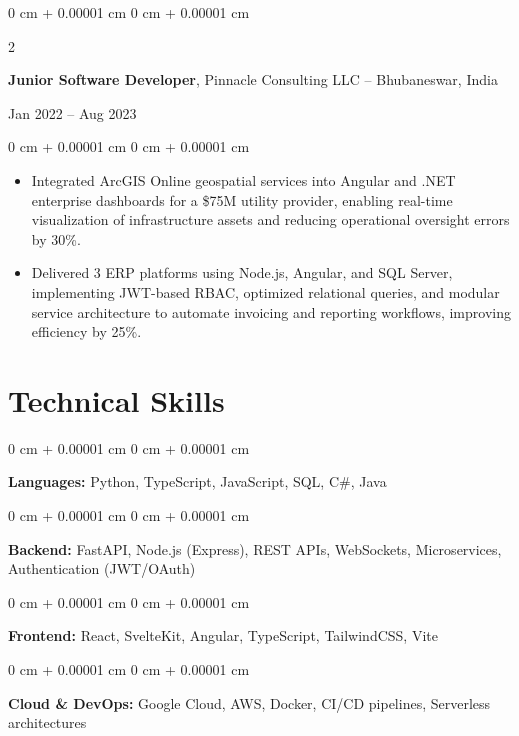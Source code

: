 \documentclass[10pt, letterpaper]{article}
\newenvironment{highlights}{
    \begin{itemize}[
        topsep=0.10 cm,
        parsep=0.10 cm,
        partopsep=0pt,
        itemsep=0pt,
        leftmargin=0 cm + 10pt
    ]
}{
    \end{itemize}
} %
\newenvironment{onecolentry}{
    \begin{adjustwidth}{
        0 cm + 0.00001 cm
    }{
        0 cm + 0.00001 cm
    }
}{
    \end{adjustwidth}
} %
\newenvironment{twocolentry}[2][]{
    \onecolentry
    \def\secondColumn{#2}
    \setcolumnwidth{\fill, 4.5 cm}
    \begin{paracol}{2}
}{
    \switchcolumn \raggedleft \secondColumn
    \end{paracol}
    \endonecolentry
} %
\renewenvironment{highlights}{
    \begin{itemize}[
        topsep=0.05cm,
        parsep=0.10cm,
        partopsep=1pt,
        itemsep=0pt,
        leftmargin=0cm + 10pt
    ]
}{
    \end{itemize}
}
\begin{document}
\begin{twocolentry}{Jan 2022 – Aug 2023}
\textbf{Junior Software Developer}, Pinnacle Consulting LLC -- Bhubaneswar, India
\end{twocolentry}
\vspace{0.05cm}
\begin{onecolentry}
\begin{highlights}
\item Integrated ArcGIS Online geospatial services into Angular and .NET enterprise dashboards for a \$75M utility provider, enabling real-time visualization of infrastructure assets and reducing operational oversight errors by 30\%.
\item Delivered 3 ERP platforms using Node.js, Angular, and SQL Server, implementing JWT-based RBAC, optimized relational queries, and modular service architecture to automate invoicing and reporting workflows, improving efficiency by 25\%.
\end{highlights}
\end{onecolentry}

\vspace{0.3cm}

\section{Technical Skills}

\begin{onecolentry}
\textbf{Languages:} Python, TypeScript, JavaScript, SQL, C\#, Java
\end{onecolentry}

\vspace{0.1cm}

\begin{onecolentry}
\textbf{Backend:} FastAPI, Node.js (Express), REST APIs, WebSockets, Microservices, Authentication (JWT/OAuth)
\end{onecolentry}

\vspace{0.1cm}

\begin{onecolentry}
\textbf{Frontend:} React, SvelteKit, Angular, TypeScript, TailwindCSS, Vite
\end{onecolentry}

\vspace{0.1cm}

\begin{onecolentry}
\textbf{Cloud \& DevOps:} Google Cloud, AWS, Docker, CI/CD pipelines, Serverless architectures
\end{onecolentry}
\end{document}
